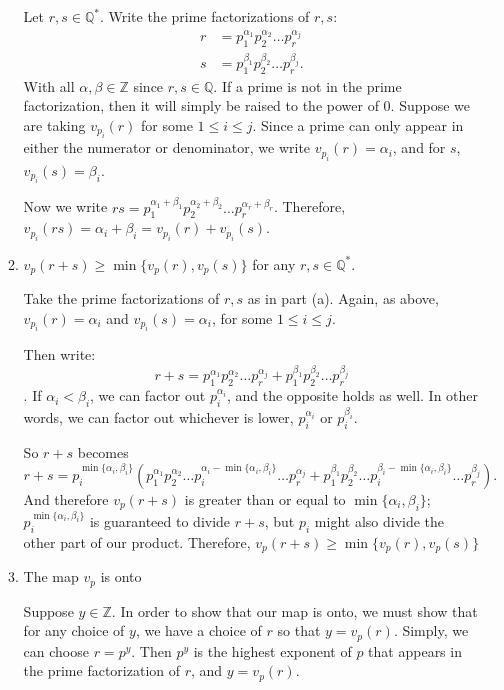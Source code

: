 \documentclass{article}
\begin{document}
\begin{enumerate}
\begin{enumerate}[label= (\alph*)]
        Let $r,s\in \mathbb{Q}^{*}$. Write the prime factorizations of $r,s$:
        \begin{align*}
            r&= p_1^{\alpha_1}p_2^{\alpha_2}\ldots p_r^{\alpha_j}\\
            s&= p_1^{\beta_1}p_2^{\beta_2}\ldots p_r^{\beta_j} 
        .\end{align*}
        With all $\alpha,\beta\in \mathbb{Z}$ since $r,s\in \mathbb{Q}$. If a prime is not in the 
        prime factorization, then it will simply be raised to the power of $0$.
        Suppose we are taking $v_{p_i}(r)$ for some $1\le i\le j$. 
        Since a prime can only appear in either the numerator or denominator, we write 
        $v_{p_i}(r)=\alpha_i$, and for $s$, $v_{p_i}(s)=\beta_i $.

        Now we write
        $rs= p_1^{\alpha_1+\beta_1}p_2^{\alpha_2+\beta_2}\ldots p_r^{\alpha_r +\beta_r} $.
        Therefore, $v_{p_i}(rs)=\alpha_i+\beta_i=v_{p_i}(r)+v_{p_i}(s)$.

    \item $v_p(r + s) \ge \min\{v_p(r), v_p(s)\}$ for any $r, s \in \mathbb{Q}^{*}.$

        Take the prime factorizations of $r,s$ as in part (a). Again, as above, $v_{p_i}(r)=\alpha_i$
        and $v_{p_i}(s)=\alpha_i$, for some $1\le i\le j$.

        Then write:
            $$r+s= p_1^{\alpha_1}p_2^{\alpha_2}\ldots p_r^{\alpha_j}
            + p_1^{\beta_1}p_2^{\beta_2}\ldots p_r^{\beta_j} $$.
        If $\alpha_i<\beta_i$, we can factor out $p_i^{\alpha_i}$, and the opposite holds as well.
        In other words, we can factor out whichever is lower, $p_i^{\alpha_i}$ or $p_i^{\beta_i}$.

        So $r+s$ becomes
            $$r+s= p_i^{\min \{\alpha_i, \beta_i\} }(p_1^{\alpha_1}p_2^{\alpha_2}\ldots 
            p_i^{\alpha_i-\min \{\alpha_i, \beta_i\} }\ldots p_r^{\alpha_j}
            + p_1^{\beta_1}p_2^{\beta_2}\ldots p_i^{\beta_i-\min \{\alpha_i, \beta_i\} }
            \ldots p_r^{\beta_j}) .$$
        And therefore $v_p(r+s)$ is greater than or equal to $\min \{\alpha_i,\beta_i\}$;
        $p_i^{\min \{\alpha_i, \beta_i\} }$ is guaranteed to divide $r+s$, but 
        $p_i$ might also divide the other part of our product.
        Therefore, $v_p(r + s) \ge \min\{v_p(r), v_p(s)\}$
    \item The map $v_p$ is onto

        Suppose $y\in \mathbb{Z}$. In order to show that our map is onto, we must show that for any 
        choice of $y$, we have a choice of $r$ so that $y=v_p(r)$. Simply, we can choose
        $r=p^{y}$. Then $p^y$ is the highest exponent of $p$ that appears in the prime factorization
        of $r$, and $y=v_p(r)$. 


\end{enumerate}
\end{enumerate}
\end{document}

